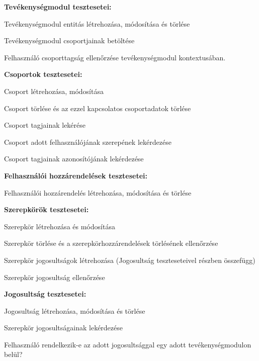 \begin{compactitem}
\item \textbf{Tevékenységmodul tesztesetei:}
\begin{compactitem}
    \item Tevékenységmodul entitás létrehozása, módosítása és törlése
    \item Tevékenységmodul csoportjainak betöltése
    \item Felhasználó csoporttagság ellenőrzése tevékenységmodul kontextusában.
\end{compactitem}
\item \textbf{Csoportok tesztesetei:}
\begin{compactitem}
    \item Csoport létrehozása, módosítása
    \item Csoport törlése és az ezzel kapcsolatos csoportadatok törlése
    \item Csoport tagjainak lekérése
    \item Csoport adott felhasználójának szerepének lekérdezése
    \item Csoport tagjainak azonosítójának lekérdezése
\end{compactitem}
\item \textbf{Felhasználói hozzárendelések tesztesetei:}
\begin{compactitem}
        \item Felhasználói hozzárendelés létrehozása, módosítása és törlése
\end{compactitem}
\item \textbf{Szerepkörök tesztesetei:}
\begin{compactitem}
        \item Szerepkör létrehozása és módosítása
        \item Szerepkör törlése és a szerepkörhozzárendelések törlésének ellenőrzése
        \item Szerepkör jogosultságok létrehozása (Jogosultság teszteseteivel részben összefügg)
        \item Szerepkör jogosultság ellenőrzése
\end{compactitem}
\item \textbf{Jogosultság tesztesetei:}
\begin{compactitem}
        \item Jogosultság létrehozása, módosítása és törlése
        \item Szerepkör jogosultságainak lekérdezése
        \item Felhasználó rendelkezik-e az adott jogosultsággal egy adott tevékenységmodulon belül?

\end{compactitem}
\end{compactitem}
